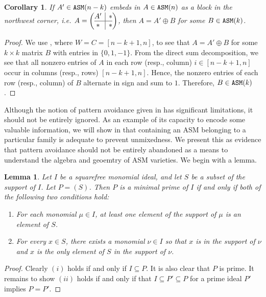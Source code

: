 \documentclass[12 pt]{amsart}
\DeclareMathOperator{\asm}{\tt ASM}
\theoremstyle{plain}
\newtheorem{cor}[thm]{Corollary}
\newtheorem{lemma}[thm]{Lemma}
\theoremstyle{definition}
\theoremstyle{remark}
\begin{document}
{\begin{cor}
    If $A' \in \asm(n-k)$ embeds in $A \in \asm(n)$ as a block in the northwest corner, i.e. $A = \left(\begin{array}{@{}c|c@{}}
    A' & * \\\hline
    *  & * 
  \end{array}\right)$, then $A = A' \oplus B$ for some $B \in \asm(k)$. 
\end{cor}
\begin{proof}
    We use , where $W = C = [n-k+1,n]$, to see that $A = A' \oplus B$ for some $k \times k$ matrix $B$ with entries in $\{0, 1, -1\}$.  From the direct sum decomposition, we see that all nonzero entries of $A$ in each row (resp., column) $i \in [n-k+1,n]$ occur in columns (resp., rows) $[n-k+1,n]$.  Hence, the nonzero entries of each row (resp., column) of $B$ alternate in sign and sum to $1$.  Therefore, $B \in \asm(k)$.
\end{proof}

Although the notion of pattern avoidance given in  has significant limitations, it should not be entirely ignored.  As an example of its capacity to encode some valuable information, we will show in  that containing an ASM belonging to a particular family is adequate to prevent unmixedness.  We present this as evidence that pattern avoidance should not be entirely abandoned as a means to understand the algebra and geoemtry of ASM varieties.  We begin with a lemma.

\begin{lemma}
\label{lem:findminprimes}
Let $I$ be a squarefree monomial ideal, and let $S$ be a subset of the support of $I$. Let $P = (S)$. Then $P$ is a minimal prime of $I$ if and only if both of the following two conditions hold:

\begin{enumerate}
    \item [(i)] For each monomial $\mu \in I$, at least one element of the support of $\mu$ is an element of $S$.
    
    \item [(ii)] For every $x \in S$, there exists a monomial $\nu \in I$ so that $x$ is in the support of $\nu$ and $x$ is the only element of $S$ in the support of $\nu$.
\end{enumerate}
\end{lemma}

\begin{proof}
Clearly $(i)$ holds if and only if $I \subseteq P$.  It is also clear that $P$ is prime.  It remains to show $(ii)$ holds if and only if that $I \subseteq P' \subseteq P$ for a prime ideal $P'$ implies $P = P'$.


\end{proof}}
\end{document}
